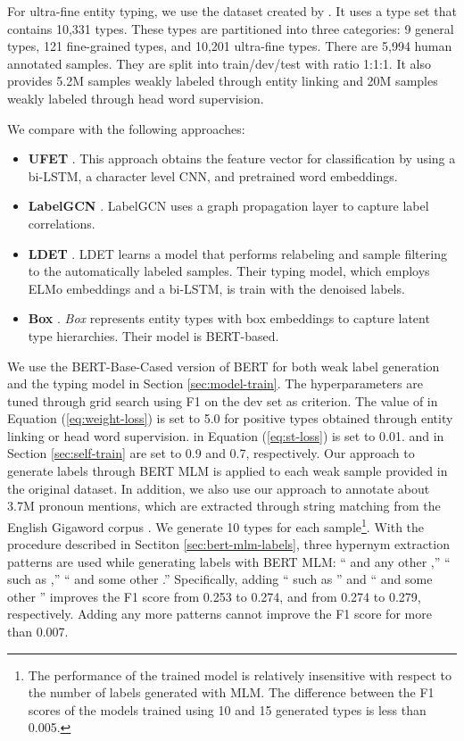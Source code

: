 \documentclass[11pt,a4paper]{article}
\begin{document}
For ultra-fine entity typing, we use the dataset created by \citet{choi2018ultra}. It uses a type set that contains 10,331 types. These types are partitioned into three categories: 9 general types, 121 fine-grained types, and 10,201 ultra-fine types. There are 5,994 human annotated samples. They are split into train/dev/test with ratio 1:1:1. It also provides 5.2M samples weakly labeled through entity linking and 20M samples weakly labeled through head word supervision.

We compare with the following approaches:

\begin{itemize}
\item \textbf{UFET} \cite{choi2018ultra}. This approach  obtains the feature vector for classification by using a bi-LSTM, a character level CNN, and pretrained word embeddings.


\item \textbf{LabelGCN} \cite{xiong2019imposing}. LabelGCN uses a graph propagation layer to capture label correlations.

\item \textbf{LDET} \cite{onoe2019learning}. LDET learns a model that performs relabeling and sample filtering to the automatically labeled samples. Their typing model, which employs ELMo embeddings and a bi-LSTM, is train with the denoised labels.

\item \textbf{Box} \cite{onoe2021modeling}. \textit{Box} represents entity types with box embeddings to capture latent type hierarchies. Their model is BERT-based.

\end{itemize}





We use the BERT-Base-Cased version of BERT for both weak label generation and the typing model in Section \ref{sec:model-train}. The hyperparameters are tuned through grid search using F1 on the dev set as criterion. The value of  in Equation (\ref{eq:weight-loss}) is set to 5.0 for positive types obtained through entity linking or head word supervision.  in Equation (\ref{eq:st-loss}) is set to 0.01.  and  in Section \ref{sec:self-train} are set to 0.9 and 0.7, respectively. Our approach to generate labels through BERT MLM is applied to each weak sample provided in the original dataset. In addition, we also use our approach to annotate about 3.7M pronoun mentions, which are extracted through string matching from the English Gigaword corpus \cite{parker2011english}. We generate 10 types for each sample\footnote{The performance of the trained model is relatively insensitive with respect to the number of labels generated with MLM. The difference between the F1 scores of the models trained using 10 and 15 generated types is less than 0.005.}. With the procedure described in Sectiton \ref{sec:bert-mlm-labels}, three hypernym extraction patterns are used while generating labels with BERT MLM: `` and any other ,'' `` such as ,'' `` and some other .'' Specifically, adding `` such as '' and `` and some other '' improves the F1 score from 0.253 to 0.274, and from 0.274 to 0.279, respectively. Adding any more patterns cannot improve the F1 score for more than 0.007.
\end{document}

